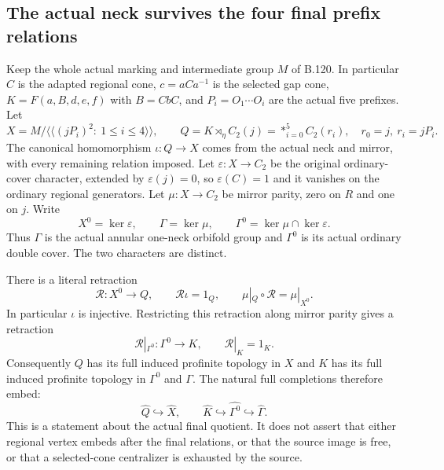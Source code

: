 \subsection*{The actual neck survives the four final prefix relations}

\label{stmt:B121}
Keep the whole actual marking and intermediate group $M$ of B.120.
In particular $C$ is the adapted regional cone,
$c=aCa^{-1}$ is the selected gap cone, $K=F(a,B,d,e,f)$ with
$B=CbC$, and $P_i=O_1\cdots O_i$ are the actual five prefixes.
Let
\begin{equation}\label{eq:B121-actual-quotient}
 X=M/\langle\!\langle(jP_i)^2:\ 1\leq i\leq4\rangle\!\rangle,
 \qquad
 Q=K\rtimes_\eta C_2(j)
   =\mathop{*}_{i=0}^{5}C_2(r_i),
 \quad r_0=j,\ r_i=jP_i.
\end{equation}
The canonical homomorphism $\iota:Q\to X$ comes from the
actual neck and mirror, with every remaining relation imposed.
Let $\varepsilon:X\to C_2$ be the original ordinary-cover
character, extended by $\varepsilon(j)=0$, so
$\varepsilon(C)=1$ and it vanishes on the ordinary regional
generators. Let $\mu:X\to C_2$ be mirror parity, zero on $R$
and one on $j$. Write
\[
 X^0=\ker\varepsilon,\qquad
 \Gamma=\ker\mu,\qquad
 \Gamma^0=\ker\mu\cap\ker\varepsilon.
\]
Thus $\Gamma$ is the actual annular one-neck orbifold group and
$\Gamma^0$ is its actual ordinary double cover. The two
characters are distinct.

There is a literal retraction
\begin{equation}\label{eq:B121-retractions}
 \mathcal R:X^0\longrightarrow Q,
 \qquad \mathcal R\iota=1_Q,
 \qquad \mu|_Q\circ\mathcal R=\mu|_{X^0}.
\end{equation}
In particular $\iota$ is injective. Restricting this retraction
along mirror parity gives a retraction
\begin{equation}\label{eq:B121-ordinary-neck-retract}
 \mathcal R|_{\Gamma^0}:\Gamma^0\longrightarrow K,
 \qquad \mathcal R|_K=1_K.
\end{equation}
Consequently $Q$ has its full induced profinite topology in $X$
and $K$ has its full induced profinite topology in $\Gamma^0$
and $\Gamma$. The natural full completions therefore embed:
\begin{equation}\label{eq:B121-completed-embeddings}
 \widehat Q\hookrightarrow\widehat X,
 \qquad \widehat K\hookrightarrow\widehat{\Gamma^0}
                         \hookrightarrow\widehat\Gamma.
\end{equation}
This is a statement about the actual final quotient. It does not
assert that either regional vertex embeds after the final relations,
or that the source image is free, or that a selected-cone
centralizer is exhausted by the source.

